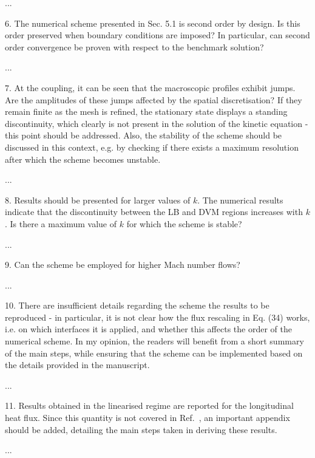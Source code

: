 \documentclass{article}
\begin{document}
...

\begin{quoting}
    6. The numerical scheme presented in Sec. 5.1 is
    second order by design. Is this order preserved
    when boundary conditions are imposed? In particular,
    can second order convergence be proven with respect
    to the benchmark solution?
\end{quoting}

...

\begin{quoting}
    7. At the coupling, it can be seen that the
    macroscopic profiles exhibit jumps. Are the
    amplitudes of these jumps affected by the spatial
    discretisation? If they remain finite as the
    mesh is refined, the stationary state displays
    a standing discontinuity, which clearly is not
    present in the solution of the kinetic equation -
    this point should be addressed. Also, the stability
    of the scheme should be discussed in this context,
    e.g. by checking if there exists a maximum
    resolution after which the scheme becomes unstable.
\end{quoting}

...

\begin{quoting}
    8. Results should be presented for larger values of
    $k$. The numerical results indicate that the
    discontinuity between the LB and DVM regions increases
    with $k$. Is there a maximum value of $k$ for which
    the scheme is stable?
\end{quoting}

...

\begin{quoting}
    9. Can the scheme be employed for higher Mach number flows?
\end{quoting}

...

\begin{quoting}
    10. There are insufficient details regarding the scheme
    the results to be reproduced - in particular, it is not
    clear how the flux rescaling in Eq. (34) works, i.e. on
    which interfaces it is applied, and whether this affects
    the order of the numerical scheme. In my opinion, the
    readers will benefit from a short summary of the main
    steps, while ensuring that the scheme can be implemented
    based on the details provided in the manuscript.
\end{quoting}

...

\begin{quoting}
    11. Results obtained in the linearised regime are
    reported for the longitudinal heat flux. Since this
    quantity is not covered in Ref.~\cite{Luo2016}, an important
    appendix should be added, detailing the main steps
    taken in deriving these results.
\end{quoting}

...

\printbibliography
\end{document}
